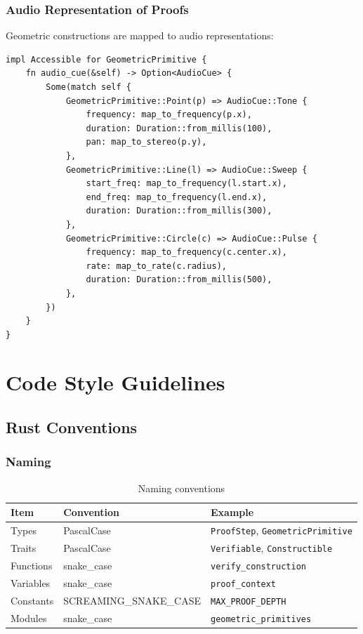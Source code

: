 \documentclass[11pt,a4paper,twoside]{report}
\begin{document}
\subsection{Audio Representation of Proofs}

Geometric constructions are mapped to audio representations:

\begin{lstlisting}[caption={Audio cue generation}, label=lst:audio]
impl Accessible for GeometricPrimitive {
    fn audio_cue(&self) -> Option<AudioCue> {
        Some(match self {
            GeometricPrimitive::Point(p) => AudioCue::Tone {
                frequency: map_to_frequency(p.x),
                duration: Duration::from_millis(100),
                pan: map_to_stereo(p.y),
            },
            GeometricPrimitive::Line(l) => AudioCue::Sweep {
                start_freq: map_to_frequency(l.start.x),
                end_freq: map_to_frequency(l.end.x),
                duration: Duration::from_millis(300),
            },
            GeometricPrimitive::Circle(c) => AudioCue::Pulse {
                frequency: map_to_frequency(c.center.x),
                rate: map_to_rate(c.radius),
                duration: Duration::from_millis(500),
            },
        })
    }
}
\end{lstlisting}

\chapter{Code Style Guidelines}
\label{chap:style}

\section{Rust Conventions}

\subsection{Naming}

\begin{table}[htbp]
\centering
\caption{Naming conventions}
\label{tab:naming}
\begin{tabular}{@{}lll@{}}
\toprule
\textbf{Item} & \textbf{Convention} & \textbf{Example} \\
\midrule
Types & PascalCase & \texttt{ProofStep}, \texttt{GeometricPrimitive} \\
Traits & PascalCase & \texttt{Verifiable}, \texttt{Constructible} \\
Functions & snake\_case & \texttt{verify\_construction} \\
Variables & snake\_case & \texttt{proof\_context} \\
Constants & SCREAMING\_SNAKE\_CASE & \texttt{MAX\_PROOF\_DEPTH} \\
Modules & snake\_case & \texttt{geometric\_primitives} \\
\bottomrule
\end{tabular}
\end{table}
\end{document}
